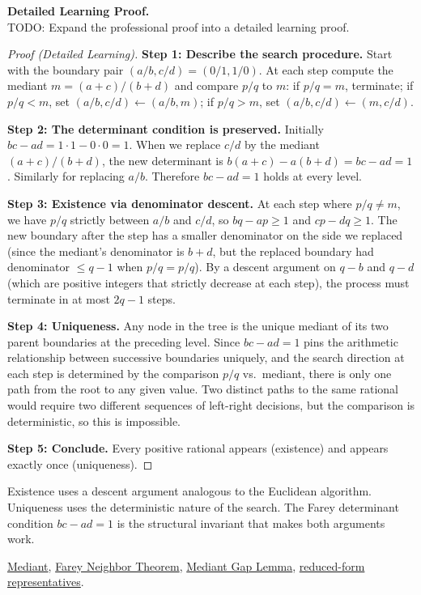 \textbf{Detailed Learning Proof.}~\\
TODO: Expand the professional proof into a detailed learning proof.


\begin{proof}[Proof (Detailed Learning)]
\textbf{Step 1: Describe the search procedure.}
Start with the boundary pair $(a/b, c/d) = (0/1, 1/0)$.
At each step compute the mediant $m = (a+c)/(b+d)$ and compare $p/q$ to $m$:
if $p/q = m$, terminate; if $p/q < m$, set $(a/b, c/d) \leftarrow (a/b, m)$;
if $p/q > m$, set $(a/b, c/d) \leftarrow (m, c/d)$.

\textbf{Step 2: The determinant condition is preserved.}
Initially $bc - ad = 1 \cdot 1 - 0 \cdot 0 = 1$.  When we replace
$c/d$ by the mediant $(a+c)/(b+d)$, the new determinant is
$b(a+c) - a(b+d) = bc - ad = 1$.  Similarly for replacing $a/b$.
Therefore $bc - ad = 1$ holds at every level.

\textbf{Step 3: Existence via denominator descent.}
At each step where $p/q \neq m$, we have $p/q$ strictly between $a/b$
and $c/d$, so $bq - ap \geq 1$ and $cp - dq \geq 1$.
The new boundary after the step has a smaller denominator on the side
we replaced (since the mediant's denominator is $b + d$, but the
replaced boundary had denominator $\leq q - 1$ when $p/q = p/q$).
By a descent argument on $q - b$ and $q - d$ (which are positive integers
that strictly decrease at each step), the process must terminate in at
most $2q - 1$ steps.

\textbf{Step 4: Uniqueness.}
Any node in the tree is the unique mediant of its two parent boundaries
at the preceding level.  Since $bc - ad = 1$ pins the arithmetic
relationship between successive boundaries uniquely, and the search
direction at each step is determined by the comparison $p/q$ vs.\ mediant,
there is only one path from the root to any given value.  Two distinct
paths to the same rational would require two different sequences of
left-right decisions, but the comparison is deterministic, so this is
impossible.

\textbf{Step 5: Conclude.}
Every positive rational appears (existence) and appears exactly once
(uniqueness).
\end{proof}

\begin{remark*}
Existence uses a descent argument analogous to the Euclidean algorithm.
Uniqueness uses the deterministic nature of the search.  The Farey
determinant condition $bc - ad = 1$ is the structural invariant that
makes both arguments work.
\end{remark*}

\begin{dependencies}
\hyperref[def:mediant]{Mediant},
\hyperref[thm:farey-neighbor-theorem]{Farey Neighbor Theorem},
\hyperref[lem:mediant-gap]{Mediant Gap Lemma},
\hyperref[thm:fraction-pair-equivalence]{reduced-form representatives}.
\end{dependencies}
